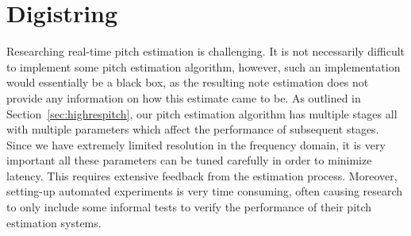 \documentclass[a4paper,10pt,twocolumn]{article}
\begin{document}



\section{Digistring}
%
Researching real-time pitch estimation is challenging. It is not necessarily difficult to implement some pitch estimation algorithm, however, such an implementation would essentially be a black box, as the resulting note estimation does not provide any information on how this estimate came to be. As outlined in Section~\ref{sec:highrespitch}, our pitch estimation algorithm has multiple stages all with multiple parameters which affect the performance of subsequent stages. Since we have extremely limited resolution in the frequency domain, it is very important all these parameters can be tuned carefully in order to minimize latency. This requires extensive feedback from the estimation process. Moreover, setting-up automated experiments is very time consuming, often causing research to only include some informal tests to verify the performance of their pitch estimation systems.
\end{document}
